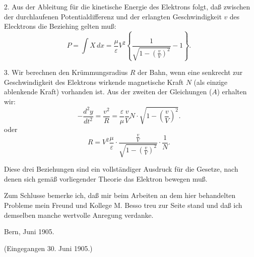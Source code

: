 \documentclass[17pt]{webarticle}       %
\begin{document}
2. Aus der Ableitung für die kinetische Energie des Elektrons folgt, daß zwischen der durchlaufenen Potentialdifferenz und der erlangten Geschwindigkeit $v$ des Elecktrons die Beziehing gelten muß:
\[
P = \int X \, dx = \frac{\mu}{\varepsilon} V^2 \left\{ \frac{1}{\sqrt{1 - \left( \frac{v}{V} \right)^2}} - 1 \right\} .
\]

3. Wir berechnen den Krümmungsradius $R$ der Bahn, wenn eine senkrecht zur Geschwindigkeit des Elektrons wirkende magnetische Kraft $N$ (als einzige ablenkende Kraft) vorhanden ist. Aus der zweiten der Gleichungen (\( A \)) erhalten wir:
\[
- \frac{d^2 y}{d t^2} = \frac{v^2}{R} = \frac{\varepsilon}{\mu} \frac{v}{V} N \cdot \sqrt{1 - \left( \frac{v}{V} \right)^2} .
\]
oder
\[
R = V^2 \frac{\mu}{\varepsilon} \cdot \frac{\frac{v}{V}}{\sqrt{1 - \left( \frac{v}{V} \right)^2}} \cdot \frac{1}{N} .
\]

Diese drei Beziehungen sind ein vollständiger Ausdruck für die Gesetze, nach denen sich gemäß vorliegender Theorie das Elektron bewegen muß.

\bigskip

Zum Schlusse bemerke ich, daß mir beim Arbeiten an dem hier behandelten Probleme mein Freund und Kollege M. Besso treu zur Seite stand und daß ich demselben manche wertvolle Anregung verdanke.

\medskip

Bern, Juni 1905.

\begin{center}
(Eingegangen 30. Juni 1905.)
\end{center}
\end{document}
